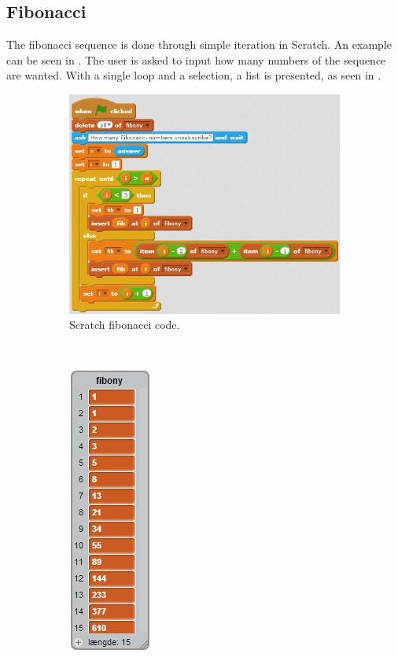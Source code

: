 \subsection{Fibonacci}
The fibonacci sequence is done through simple iteration in Scratch. An example can be seen in . The user is asked to input how many numbers of the sequence are wanted. With a single loop and a selection, a list is presented, as seen in .

\begin{figure}[h]
  \centering
    \begin{subfigure}[b]{0.45\textwidth}
    \begin{center}
      \includegraphics[scale=0.7]{./pics/scratch_fibo_code}
      \caption{Scratch fibonacci code.}
      \label{fig:scratch_fibo_code}
    \end{center}
    \end{subfigure}
    ~
    \begin{subfigure}[b]{0.45\textwidth}
    \begin{center}
      \includegraphics[scale=0.6]{./pics/scratch_fibo_out}

\end{center}
\end{subfigure}
\end{figure}
